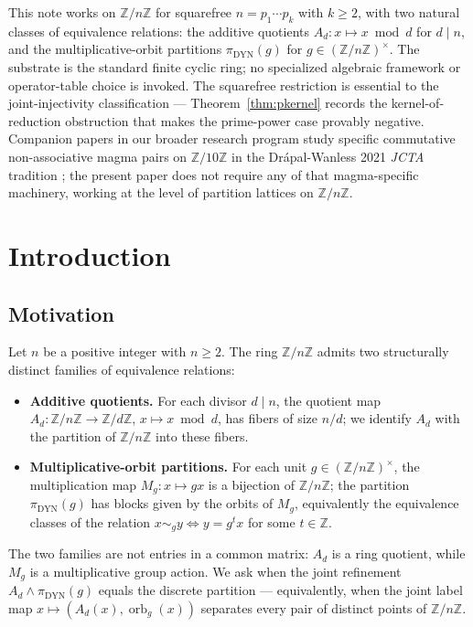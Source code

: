 \documentclass[11pt,reqno]{amsart}
\theoremstyle{plain}
\theoremstyle{definition}
\theoremstyle{remark}
\DeclareMathOperator{\orb}{orb}
\DeclareMathOperator{\dyn}{DYN}
\newcommand{\Z}{\mathbb{Z}}
\begin{document}
This note works on $\Z/n\Z$ for squarefree $n = p_{1} \cdots p_{k}$
with $k \ge 2$, with two natural classes of equivalence relations:
the additive quotients $A_{d} : x \mapsto x \bmod d$ for $d \mid n$,
and the multiplicative-orbit partitions $\pi_{\dyn}(g)$ for $g \in
(\Z/n\Z)^{\times}$. The substrate is the standard finite cyclic ring;
no specialized algebraic framework or operator-table choice is invoked.
The squarefree restriction is essential to the joint-injectivity
classification --- Theorem~\ref{thm:pkernel} records the
kernel-of-reduction obstruction that makes the prime-power case
provably negative. Companion papers in our broader research program
study specific commutative non-associative magma pairs on $\Z/10\Z$
in the Dr\'apal-Wanless 2021 \emph{JCTA} tradition
\cite{DrapalWanless2021}; the present paper does not require any of
that magma-specific machinery, working at the level of partition
lattices on $\Z/n\Z$.

\section{Introduction}\label{sec:intro}

\subsection{Motivation}

Let $n$ be a positive integer with $n \ge 2$. The ring $\Z/n\Z$
admits two structurally distinct families of equivalence relations:
\begin{itemize}
\item \textbf{Additive quotients.} For each divisor $d \mid n$, the
quotient map $A_{d} : \Z/n\Z \to \Z/d\Z$, $x \mapsto x \bmod d$, has
fibers of size $n/d$; we identify $A_{d}$ with the partition of
$\Z/n\Z$ into these fibers.
\item \textbf{Multiplicative-orbit partitions.} For each unit $g \in
(\Z/n\Z)^{\times}$, the multiplication map $M_{g} : x \mapsto gx$ is
a bijection of $\Z/n\Z$; the partition $\pi_{\dyn}(g)$ has blocks
given by the orbits of $M_{g}$, equivalently the equivalence classes
of the relation $x \sim_{g} y \iff y = g^{t} x$ for some $t \in \Z$.
\end{itemize}
The two families are not entries in a common matrix: $A_{d}$ is a
ring quotient, while $M_{g}$ is a multiplicative group action. We
ask when the joint refinement $A_{d} \wedge \pi_{\dyn}(g)$ equals
the discrete partition --- equivalently, when the joint label map
$x \mapsto (A_{d}(x), \orb_{g}(x))$ separates every pair of distinct
points of $\Z/n\Z$.
\end{document}
